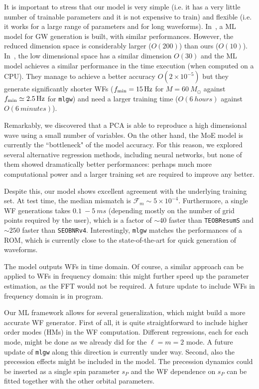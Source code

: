 \documentclass[twocolumn,showpacs,preprintnumbers,nofootinbib,prd,
superscriptaddress,10pt]{revtex4-1}
\begin{document}
It is important to stress that our model is very simple (i.e. it has a very little number of trainable parameters and 
it is not expensive to train) and flexible (i.e. it works for a large range of parameters and for long waveforms).
In~\cite{Chua_2019}, a ML model for GW generation is built, with similar performances.
However, the reduced dimension space is considerably larger ($O(200)$) than ours ($O(10)$).
In~\cite{Khan:2020fso}, the low dimensional space has a similar dimension $O(30)$ and the ML model achieves a similar performance in the time execution (when computed on a CPU). They manage to achieve a better accuracy $O(2\times10^{-5})$ but they generate significantly shorter WFs ($f_{\rm min} = \SI{15}{Hz}$ for $M = \SI{60}{M_{\odot}}$ against $f_{\rm min} \simeq \SI{2.5}{Hz}$ for \texttt{mlgw}) and need a larger training time ($O(\SI{6}{hours})$ against $O(\SI{6}{minutes})$).

Remarkably, we discovered that a PCA is able to reproduce a high dimensional wave using a small number of variables.
On the other hand, the MoE model is currently the ``bottleneck" of the model accuracy. For this reason, we explored 
several alternative regression methods, including neural networks, but none of them showed dramatically better 
performances: perhaps much more computational power and a larger training set are required to improve any better.

Despite this, our model shows excellent agreement with the underlying training set. At test time, 
the median mismatch is ${\mathcal{F}_m\sim 5 \times 10^{-4}}$.
Furthermore, a single WF generations takes $\SI{0.1}{}-\SI{5}{ms}$ (depending mostly on the 
number of grid points required by the user), which is a factor of $\sim 40$ faster than \texttt{TEOBResumS}
and $\sim 250$ faster than \texttt{SEOBNRv4}.
Interestingly, \texttt{mlgw} matches the performances of a ROM, which is currently close to the state-of-the-art 
for quick generation of waveforms.

The model outputs WFs in time domain. Of course, a similar approach can be applied to WFs in frequency domain: 
this might further speed up the parameter estimation, as the FFT would not be required. A future update to include 
WFs in frequency domain is in program.

Our ML framework allows for several generalization, which might build a more accurate WF generator.
First of all, it is quite straightforward to include higher order modes (HMs) in the WF computation. 
Different regressions, each for each mode, might be done as we already did for the $\ell=m=2$ mode. 
A future update of \texttt{mlgw} along this direction is currently under way.
Second, also the precession effects might be included in the model.
The precession dynamics could be inserted as a single spin parameter $s_P$ \cite{Schmidt2015Precession} 
and the WF dependence on $s_P$ can be fitted together with the other orbital parameters.
\end{document}
